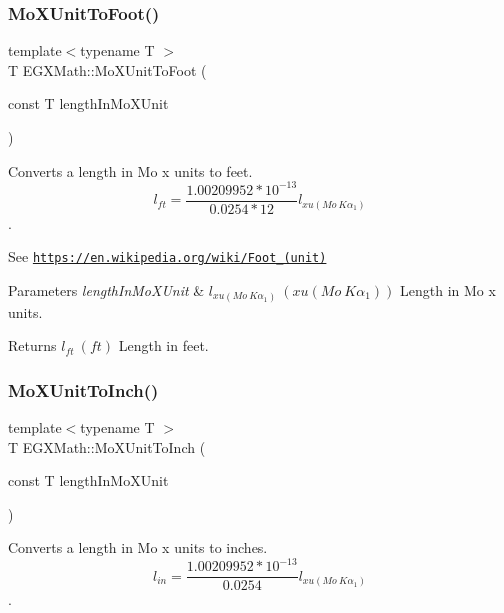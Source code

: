 \subsubsection{\texorpdfstring{Mo\+X\+Unit\+To\+Foot()}{MoXUnitToFoot()}}
{\footnotesize\ttfamily template$<$typename T $>$ \\
T E\+G\+X\+Math\+::\+Mo\+X\+Unit\+To\+Foot (\begin{DoxyParamCaption}\item[{const T}]{length\+In\+Mo\+X\+Unit }\end{DoxyParamCaption})}



Converts a length in Mo x units to feet. \[ l_{ft}= \frac{1.00209952*10^{-13}}{0.0254 * 12} l_{xu(Mo\ K\alpha_1)} \]. 

See \href{https://en.wikipedia.org/wiki/Foot_(unit)}{\tt https\+://en.\+wikipedia.\+org/wiki/\+Foot\+\_\+(unit)} 
\begin{DoxyParams}{Parameters}
{\em length\+In\+Mo\+X\+Unit} & $ l_{xu(Mo\ K\alpha_1)}\ (xu(Mo\ K\alpha_1))$ Length in Mo x units. \\
\hline
\end{DoxyParams}
\begin{DoxyReturn}{Returns}
$ l_{ft}\ (ft)$ Length in feet. 
\end{DoxyReturn}
\mbox{\label{group___e_g_x_math-_conversions-_length_conversions-_non-_s_i-_mo_x_unit-_imperial_ga98ea06a1705222e038de1b19f8bfbe4b}} 
\subsubsection{\texorpdfstring{Mo\+X\+Unit\+To\+Inch()}{MoXUnitToInch()}}
{\footnotesize\ttfamily template$<$typename T $>$ \\
T E\+G\+X\+Math\+::\+Mo\+X\+Unit\+To\+Inch (\begin{DoxyParamCaption}\item[{const T}]{length\+In\+Mo\+X\+Unit }\end{DoxyParamCaption})}



Converts a length in Mo x units to inches. \[ l_{in}= \frac{1.00209952*10^{-13}}{0.0254} l_{xu(Mo\ K\alpha_1)} \]. 


